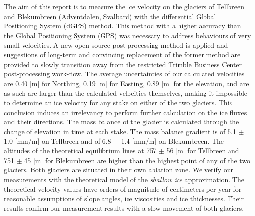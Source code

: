 The aim of this report is to measure the ice velocity on the glaciers of Tellbreen and Blekumbreen (Adventdalen, Svalbard) with the differential Global Positioning System (dGPS) method. This method with a higher accuracy than the Global Positioning System (GPS) was necessary to address behaviours of very small velocities.
A new open-source post-processing method is applied and suggestions of long-term and convincing replacement of the former method are provided to slowly transition away from the restricted Trimble Business Center post-processing work-flow.
The average uncertainties of our calculated velocities are 0.40 [m] for Northing, 0.19 [m] for Easting, 0.89 [m] for the elevation, and are as such are larger than the calculated velocities themselves, making it impossible to determine an ice velocity for any stake on either of the two glaciers. This conclusion induces an irrelevancy to perform further calculation on the ice fluxes and their directions.
The mass balance of the glacier is calculated through the change of elevation in time at each stake. 
The mass balance gradient is of 5.1 $\pm$ 1.0 [mm/m] on Tellbreen and of 6.8 $\pm$ 1.4 [mm/m] on Blekumbreen. The altitudes of the theoretical equilibrium lines at 757 $\pm$ 56 [m] for Tellbreen and 751 $\pm$ 45 [m] for Blekumbreen are higher than the highest point of any of the two glaciers. Both glaciers are situated in their own ablation zone.
We verify our measurements with the theoretical model of the \textit{shallow ice} approximation. The theoretical velocity values have orders of magnitude of centimeters per year for reasonable assumptions of slope angles, ice viscosities and ice thicknesses. Their results confirm our measurement results with a slow movement of both glaciers.